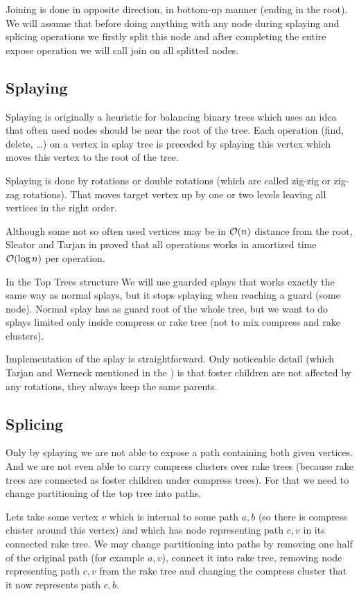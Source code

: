 Joining is done in opposite direction, in bottom-up manner (ending in the root).
We will assume that before doing anything with any node during splaying and
splicing operations we firstly split this node and after completing the entire
expose operation we will call join on all splitted nodes.

\subsection{Splaying}

Splaying is originally a heuristic for balancing binary trees which uses an idea
that often used nodes should be near the root of the tree. Each operation (find,
delete, \dots) on a vertex in splay tree is preceded by splaying this vertex
which moves this vertex to the root of the tree.

Splaying is done by rotations or double rotations (which are called {\I zig-zig}
or {\I zig-zag} rotations). That moves target vertex up by one or two levels
leaving all vertices in the right order.

Although some not so often used vertices may be in ${\cal O}(n)$ distance from the
root, Sleator and Tarjan in \cite{SelfAdjustingBST} proved that all operations
works in amortized time ${\cal O}(\log n)$ per operation.

In the Top Trees structure We will use {\I guarded splays} that works exactly
the same way as normal splays, but it stops splaying when reaching a guard (some
node). Normal splay has as guard root of the whole tree, but we want to do
splays limited only inside compress or rake tree (not to mix compress and
rake clusters).

Implementation of the splay is straightforward. Only noticeable detail (which
Tarjan and Werneck mentioned in the \cite{SelfAdjustingTT}) is that foster
children are not affected by any rotations, they always keep the same parents.

\subsection{Splicing}

Only by splaying we are not able to expose a path containing both given
vertices. And we are not even able to carry compress clusters over rake trees
(because rake trees are connected as foster children under compress trees). For
that we need to change partitioning of the top tree into paths.

Lets take some vertex $v$ which is internal to some path $a,b$ (so there is
compress cluster around this vertex) and which has node representing path $c,v$
in its connected rake tree. We may change partitioning into paths by removing
one half of the original path (for example $a,v$), connect it into rake tree,
removing node representing path $c,v$ from the rake tree and changing the
compress cluster that it now represents path $c,b$.

